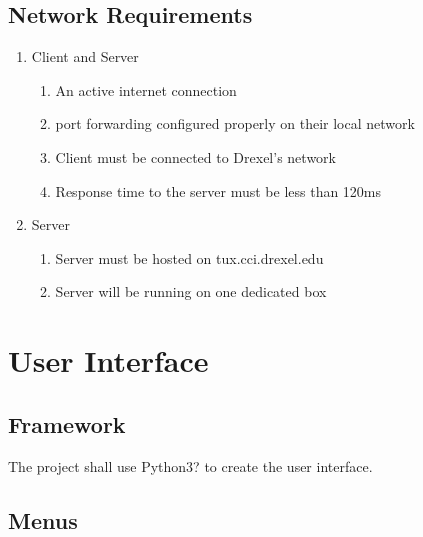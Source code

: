 \documentclass[10pt]{article}
\begin{document}
\subsection{Network Requirements}

\begin{enumerate}[label*=N\arabic*.]
    \item Client and Server
	 \begin{enumerate}[label*=\arabic*.]
        \item An active internet connection
        \item port forwarding configured properly on their local network
        \item Client must be connected to Drexel's network
        \item Response time to the server must be less than 120ms
	  \end{enumerate}
    \item Server
 	\begin{enumerate}[label*=\arabic*.]
        \item Server must be hosted on tux.cci.drexel.edu
        \item Server will be running on one dedicated box
  \end{enumerate}
\end{enumerate}

\section{User Interface}

\subsection{Framework}

The project shall use Python3? to create the user interface.

\subsection{Menus}
\end{document}
